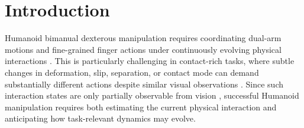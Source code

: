 \documentclass{article} %
\begin{document}

    
    
    

\section{Introduction}


Humanoid bimanual dexterous manipulation requires coordinating dual-arm motions and fine-grained finger actions under continuously evolving physical interactions \cite{chen2024bidexhands,liu2025rdt}. This is particularly challenging in contact-rich tasks, where subtle changes in deformation, slip, separation, or contact mode can demand substantially different actions despite similar visual observations \cite{liu2025dextrack}. Since such interaction states are only partially observable from vision \cite{liu2025vtdexmanip}, successful Humanoid manipulation requires both estimating the current physical interaction and anticipating how task-relevant dynamics may evolve.
\end{document}
